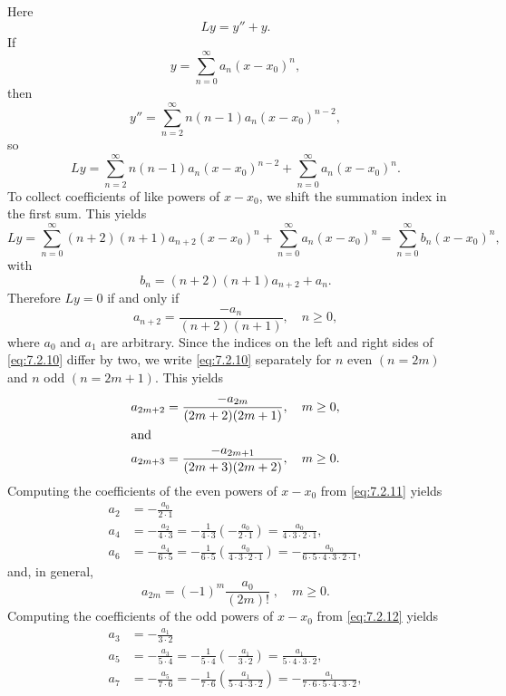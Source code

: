 \begin{solution}
Here
\[
Ly=y''+y.
\]
If
\[
y=\sum_{n=0}^\infty a_n(x-x_0)^n,
\]
then
\[
y''=\sum_{n=2}^\infty n(n-1)a_n(x-x_0)^{n-2},
\]
so
\[
Ly=\sum_{n=2}^\infty n(n-1)a_n(x-x_0)^{n-2}+\sum_{n=0}^\infty a_n(x-x_0)^n.
\]
To collect coefficients of like powers of $x-x_0$, we shift the summation
index in the first sum. This yields
\[
Ly=\sum^\infty_{n=0}(n+2)(n+1)a_{n+2}(x-x_0)^n +
 \sum^\infty_{n=0}a_n(x-x_0)^n
=\sum^\infty_{n=0}b_n(x-x_0)^n,
\]
with
\[
b_n=(n+2)(n+1)a_{n+2}+a_n.
\]
Therefore $Ly=0$ if and only if
\begin{equation}\label{eq:7.2.10}
a_{n+2}=\frac{-a_n}{(n+2)(n+1)},\quad n\ge0,
\end{equation}
where $a_0$ and $a_1$ are arbitrary. Since the indices on the left and
right sides of \eqref{eq:7.2.10} differ by two, we write \eqref{eq:7.2.10}
separately for $n$ even $(n=2m)$ and $n$ odd $(n=2m+1)$. This yields
\begin{align}
a_{2m+2}&=\frac{-a_{2m}}{(2m+2)(2m+1)},\quad m\ge0,
\label{eq:7.2.11} \\%
\shortintertext{and}
a_{2m+3}&=\frac{-a_{2m+1}}{(2m+3)(2m+2)},\quad  m\ge0.
\label{eq:7.2.12}
\end{align}
Computing the coefficients of the even powers of $x-x_0$ from
\eqref{eq:7.2.11} yields
\begin{align*}
a_2&=-\frac{a_0}{2\cdot1}\\
a_4&=-\frac{a_2}{4\cdot3}=-\frac{1}{4\cdot3}
 \left(-\frac{a_0}{2\cdot1}\right)=
 \frac{a_0}{4\cdot3\cdot2\cdot1}, \\
a_6&=-\frac{a_4}{6\cdot5}=-\frac{1}{6\cdot5}
 \left(\frac{a_0}{4\cdot3\cdot2\cdot1}\right)
=-\frac{a_0}{6\cdot5\cdot4\cdot3\cdot
 2\cdot1},
\end{align*}
and, in general,
\begin{equation}\label{eq:7.2.13}
a_{2m}=(-1)^m \frac{a_0}{(2m)!}\;   ,\quad  m\ge0.
\end{equation}
Computing the coefficients of the odd powers of $x-x_0$ from \eqref{eq:7.2.12}
yields
\begin{align*}
a_3&=-\frac{a_1}{3\cdot2}\\
a_5&=-\frac{a_3}{5\cdot4}=-\frac{1}{5\cdot4}
 \left(-\frac{a_1}{3\cdot2}\right)=
 \frac{a_1}{5\cdot4\cdot3\cdot2}, \\
a_7&=-\frac{a_5}{7\cdot6}=-\frac{1}{7\cdot6}
 \left(\frac{a_1}{5\cdot4\cdot3\cdot2}\right)
=-\frac{a_1}{7\cdot6\cdot5\cdot4\cdot
 3\cdot2},
\end{align*}

\end{solution}
